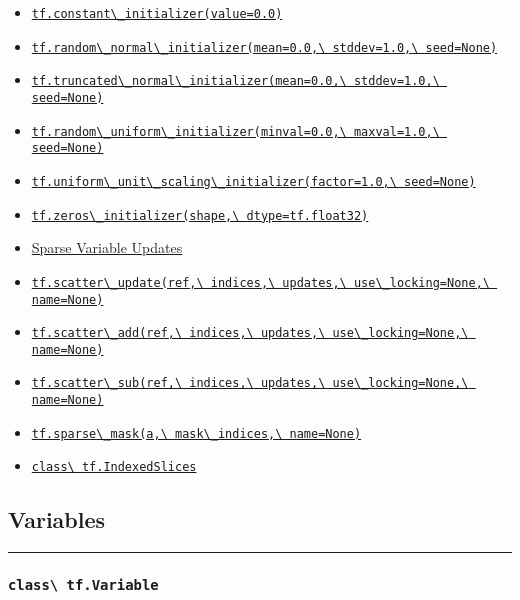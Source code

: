 \begin{itemize}
\item
  \protect\hyperlink{constantux5finitializer}{\lstinline{tf.constant\_initializer(value=0.0)}}
\item
  \protect\hyperlink{randomux5fnormalux5finitializer}{\lstinline{tf.random\_normal\_initializer(mean=0.0,\ stddev=1.0,\ seed=None)}}
\item
  \protect\hyperlink{truncatedux5fnormalux5finitializer}{\lstinline{tf.truncated\_normal\_initializer(mean=0.0,\ stddev=1.0,\ seed=None)}}
\item
  \protect\hyperlink{randomux5funiformux5finitializer}{\lstinline{tf.random\_uniform\_initializer(minval=0.0,\ maxval=1.0,\ seed=None)}}
\item
  \protect\hyperlink{uniformux5funitux5fscalingux5finitializer}{\lstinline{tf.uniform\_unit\_scaling\_initializer(factor=1.0,\ seed=None)}}
\item
  \protect\hyperlink{zerosux5finitializer}{\lstinline{tf.zeros\_initializer(shape,\ dtype=tf.float32)}}
\item
  \protect\hyperlink{AUTOGENERATED-sparse-variable-updates}{Sparse
  Variable Updates}
\item
  \protect\hyperlink{scatterux5fupdate}{\lstinline{tf.scatter\_update(ref,\ indices,\ updates,\ use\_locking=None,\ name=None)}}
\item
  \protect\hyperlink{scatterux5fadd}{\lstinline{tf.scatter\_add(ref,\ indices,\ updates,\ use\_locking=None,\ name=None)}}
\item
  \protect\hyperlink{scatterux5fsub}{\lstinline{tf.scatter\_sub(ref,\ indices,\ updates,\ use\_locking=None,\ name=None)}}
\item
  \protect\hyperlink{sparseux5fmask}{\lstinline{tf.sparse\_mask(a,\ mask\_indices,\ name=None)}}
\item
  \protect\hyperlink{IndexedSlices}{\lstinline{class\ tf.IndexedSlices}}
\end{itemize}

\subsection{Variables }\label{variables-2}

\begin{center}\rule{0.5\linewidth}{\linethickness}\end{center}

\subsubsection{\texorpdfstring{\lstinline{class\ tf.Variable}
}{class tf.Variable }}\label{class-tf.variable}

